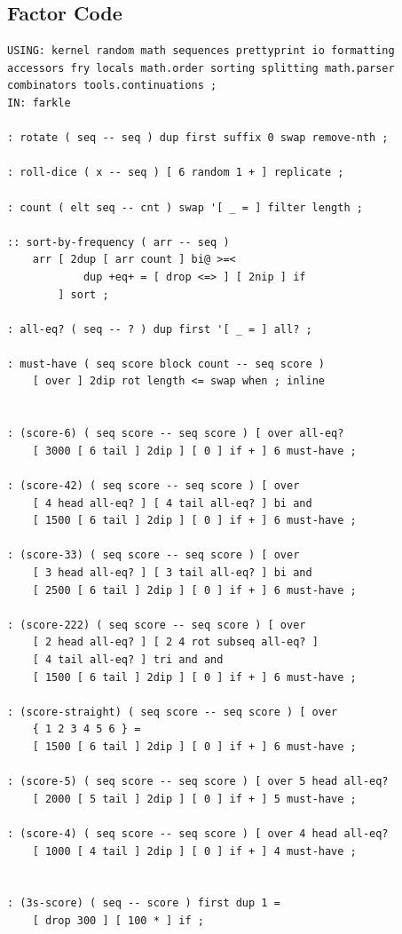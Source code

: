 \documentclass{article}
\begin{document}
\subsection{Factor Code}

\lstset{language=C,numbers=left,showspaces=false,showstringspaces=false,basicstyle=\footnotesize,numberstyle=\footnotesize}
\begin{lstlisting}
USING: kernel random math sequences prettyprint io formatting
accessors fry locals math.order sorting splitting math.parser
combinators tools.continuations ;
IN: farkle

: rotate ( seq -- seq ) dup first suffix 0 swap remove-nth ;

: roll-dice ( x -- seq ) [ 6 random 1 + ] replicate ;

: count ( elt seq -- cnt ) swap '[ _ = ] filter length ;

:: sort-by-frequency ( arr -- seq )
    arr [ 2dup [ arr count ] bi@ >=<
            dup +eq+ = [ drop <=> ] [ 2nip ] if
        ] sort ;
    
: all-eq? ( seq -- ? ) dup first '[ _ = ] all? ;

: must-have ( seq score block count -- seq score )
    [ over ] 2dip rot length <= swap when ; inline
    

: (score-6) ( seq score -- seq score ) [ over all-eq?
    [ 3000 [ 6 tail ] 2dip ] [ 0 ] if + ] 6 must-have ;

: (score-42) ( seq score -- seq score ) [ over
    [ 4 head all-eq? ] [ 4 tail all-eq? ] bi and
    [ 1500 [ 6 tail ] 2dip ] [ 0 ] if + ] 6 must-have ;

: (score-33) ( seq score -- seq score ) [ over
    [ 3 head all-eq? ] [ 3 tail all-eq? ] bi and
    [ 2500 [ 6 tail ] 2dip ] [ 0 ] if + ] 6 must-have ;

: (score-222) ( seq score -- seq score ) [ over
    [ 2 head all-eq? ] [ 2 4 rot subseq all-eq? ]
    [ 4 tail all-eq? ] tri and and
    [ 1500 [ 6 tail ] 2dip ] [ 0 ] if + ] 6 must-have ;

: (score-straight) ( seq score -- seq score ) [ over
    { 1 2 3 4 5 6 } =
    [ 1500 [ 6 tail ] 2dip ] [ 0 ] if + ] 6 must-have ;

: (score-5) ( seq score -- seq score ) [ over 5 head all-eq?
    [ 2000 [ 5 tail ] 2dip ] [ 0 ] if + ] 5 must-have ;

: (score-4) ( seq score -- seq score ) [ over 4 head all-eq?
    [ 1000 [ 4 tail ] 2dip ] [ 0 ] if + ] 4 must-have ;


: (3s-score) ( seq -- score ) first dup 1 =
    [ drop 300 ] [ 100 * ] if ;


\end{lstlisting}
\end{document}
